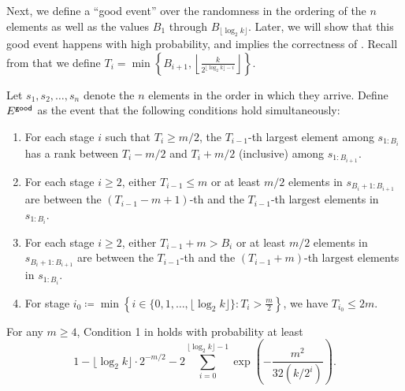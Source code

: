 Next, we define a ``good event'' over the randomness in the ordering of the $n$ elements as well as the values $B_1$ through $B_{\lfloor \log_2 k\rfloor}$. Later, we will show that this good event happens with high probability, and implies the correctness of . Recall from  that we define $T_i = \min\left\{B_{i+1},\left\lfloor\frac{k}{2^{ \lfloor\log_2 k\rfloor  - i}}\right\rfloor\right\}.$
\begin{definition}\label{def.egood}
    Let $s_1, s_2, \ldots, s_n$ denote the $n$ elements in the order in which they arrive. Define $E^{\textsf{good}}$ as the event that the following conditions hold simultaneously:
    \begin{enumerate}
        \item For each stage $i$ such that $T_i \ge m / 2$, the $T_{i-1}$-th largest element among $s_{1:B_i}$ has a rank between $T_{i} - m/2$ and $T_i + m/2$ (inclusive) among $s_{1:B_{i+1}}$.
       \item For each stage $i\ge 2$, 
           either $T_{i-1} \le m$ or at least $m/2$ elements in $s_{B_i +1:B_{i+1}}$ are between the $(T_{i-1}-m+1)$-th and the $ T_{i-1}$-th largest elements in $s_{1:B_i}$.
        \item For each stage $i \ge 2$, 
         either $T_{i-1}  + m> B_i$ or at least $m / 2$ elements in $s_{B_i +1:B_{i+1}}$ are between the $T_{i-1}$-th and the $(T_{i-1} + m)$-th largest elements in $s_{1:B_i}$.
         \item For stage $i_0 \coloneqq \min\left\{i \in \{0, 1, \ldots, \lfloor \log_2 k \rfloor \}: T_{i} > \frac{m}{2} \right\}$, we have $T_{i_0} \le 2m$.
    \end{enumerate}
\end{definition}

\begin{lemma}\label{lemma:exact-cond-1}
   For any $m \ge 4$,
Condition 1 in  holds with probability at least
    \[
        1-   \lfloor\log_2 k \rfloor\cdot2^{-m/2} - 2\sum_{i=0}^{\lfloor\log_2k\rfloor-1}\exp\left(- \frac{m^2}{32(k/2^i)}\right).
    \]
\end{lemma}

